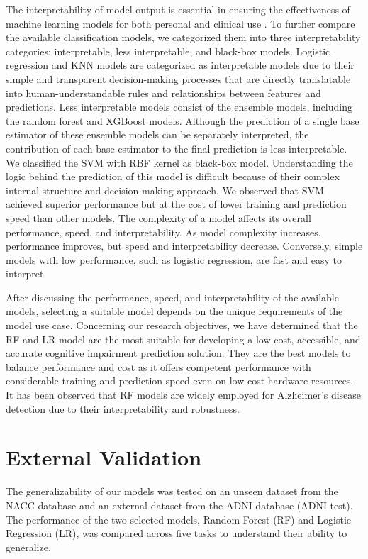 The interpretability of model output is essential in ensuring the effectiveness of machine learning models for both personal and clinical use \cite{Khan2021Machine}. To further compare the available classification models, we categorized them into three interpretability categories: interpretable, less interpretable, and black-box models. Logistic regression and KNN models are categorized as interpretable models due to their simple and transparent decision-making processes that are directly translatable into human-understandable rules and relationships between features and predictions. Less interpretable models consist of the ensemble models, including the random forest and XGBoost models. Although the prediction of a single base estimator of these ensemble models can be separately interpreted, the contribution of each base estimator to the final prediction is less interpretable. We classified the SVM with RBF kernel as black-box model. Understanding the logic behind the prediction of this model is difficult because of their complex internal structure and decision-making approach. We observed that SVM achieved superior performance but at the cost of lower training and prediction speed than other models. The complexity of a model affects its overall performance, speed, and interpretability. As model complexity increases, performance improves, but speed and interpretability decrease. Conversely, simple models with low performance, such as logistic regression, are fast and easy to interpret.  

After discussing the performance, speed, and interpretability of the available models, selecting a suitable model depends on the unique requirements of the model use case. Concerning our research objectives, we have determined that the RF and LR model are the most suitable for developing a low-cost, accessible, and accurate cognitive impairment prediction solution. They are the best models to balance performance and cost as it offers competent performance with considerable training and prediction speed even on low-cost hardware resources. It has been observed that RF models are widely employed for Alzheimer's disease detection due to their interpretability and robustness.

\section{External Validation}
The generalizability of our models was tested on an unseen dataset from the NACC database and an external dataset from the ADNI database (ADNI test). The performance of the two selected models, Random Forest (RF) and Logistic Regression (LR), was compared across five tasks to understand their ability to generalize.

